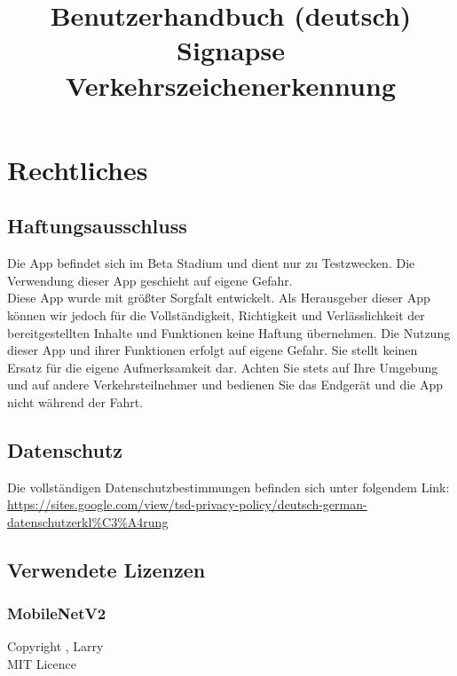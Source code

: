 \documentclass[12pt,a4paper,ngerman,enabledeprecatedfontcommands]{article}
\title{Benutzerhandbuch (deutsch)\\Signapse\\Verkehrszeichenerkennung}
\begin{document}
\maketitle

\section{Rechtliches}

\subsection{Haftungsausschluss}
Die App befindet sich im Beta Stadium und dient nur zu Testzwecken. Die Verwendung dieser App geschieht auf eigene Gefahr.\\
Diese App wurde mit größter Sorgfalt entwickelt. Als Herausgeber dieser App können wir jedoch für die Vollständigkeit, Richtigkeit und Verlässlichkeit der bereitgestellten Inhalte und Funktionen keine Haftung übernehmen. Die Nutzung dieser App und ihrer Funktionen erfolgt auf eigene Gefahr. Sie stellt keinen Ersatz für die eigene Aufmerksamkeit dar. Achten Sie stets auf Ihre Umgebung und auf andere Verkehrsteilnehmer und bedienen Sie das Endgerät und die App nicht während der Fahrt.\\

\subsection{Datenschutz}
Die vollständigen Datenschutzbestimmungen befinden sich unter folgendem Link:\\ \url{https://sites.google.com/view/tsd-privacy-policy/deutsch-german-datenschutzerkl\%C3\%A4rung}

\subsection{Verwendete Lizenzen}

\subsubsection{MobileNetV2}
Copyright , Larry\\
MIT Licence
\end{document}
